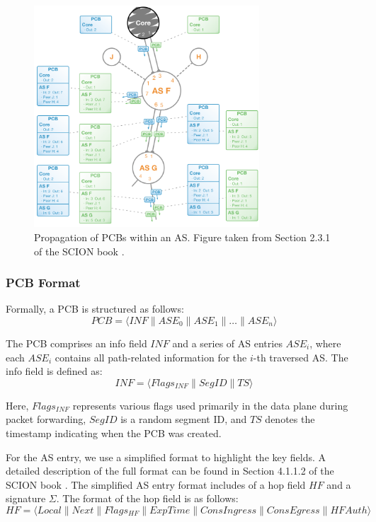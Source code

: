 \begin{figure}[h]
    \centering
    \includegraphics[width=0.75\textwidth]{figures/scion_beacon.png}
    \caption{Propagation of PCBs within an AS. Figure taken from Section 2.3.1 of the SCION book \cite{Perrig2022}.}
    \label{fig:scion_path_exploration}
\end{figure}

\subsubsection{PCB Format}
Formally, a PCB is structured as follows:
$$ PCB = \langle INF \parallel ASE_0 \parallel ASE_1 \parallel \ldots \parallel ASE_n \rangle $$

The PCB comprises an info field $INF$ and a series of AS entries $ASE_i$, where each $ASE_i$ contains all path-related information for the $i$-th traversed AS.
The info field is defined as:
$$ INF = \langle Flags_{INF} \parallel SegID \parallel TS \rangle $$

Here, $Flags_{INF}$ represents various flags used primarily in the data plane during packet forwarding, $SegID$ is a random segment ID, and $TS$ denotes the timestamp indicating when the PCB was created.

For the AS entry, we use a simplified format to highlight the key fields.
A detailed description of the full format can be found in Section 4.1.1.2 of the SCION book \cite{Perrig2022}.
The simplified AS entry format includes of a hop field $HF$ and a signature $\Sigma$.
The format of the hop field is as follows:
$$ HF = \langle Local \parallel Next \parallel Flags_{HF} \parallel ExpTime \parallel ConsIngress \parallel ConsEgress \parallel HFAuth\rangle $$

